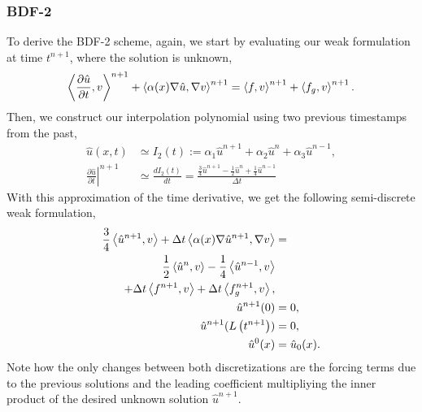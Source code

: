 \documentclass[../main.tex]{subfiles}
\newcommand{\inner}[2]{\left<#1, #2\right>}
\begin{document}
\subsubsection{BDF-2}
To derive the BDF-2 scheme, again, we start by evaluating our weak formulation at time $t^{n+1}$, where the solution is unknown,
\begin{equation}
    \inner{\frac{\partial \hat{u}}{\partial t}}{v}^{n+1} + \inner{\alpha(x) \grad \hat{u}}{\grad v}^{n+1} = \inner{f}{v}^{n+1} + \inner{f_g}{v}^{n+1}.
\end{equation}
Then, we construct our interpolation polynomial using two previous timestamps from the past, 
\begin{align}
    \hat{u}(x,t) &\simeq I_2(t) := 
      \alpha_1 \hat{u}^{n+1} 
    + \alpha_2 \hat{u}^{n}
    + \alpha_3 \hat{u}^{n-1}, \\
    \left.\frac{\partial\hat{u}}{\partial t}\right|^{n+1} &\simeq \frac{d I_2(t)}{dt} = 
    \frac{\frac{3}{4}\hat{u}^{n+1} - \frac{1}{2}\hat{u}^{n} + \frac{1}{4}\hat{u}^{n-1}}{\Delta t}
\end{align}
With this approximation of the time derivative, we get the following semi-discrete weak formulation, 
\begin{subequations}
    \begin{align}
        \label{eq:1d_fom_weak_formulation_semidiscrete_time_bdf2}
        \frac{3}{4}\inner{\hat{u}^{n+1}}{v} + \Delta t \inner{\alpha(x) \grad \hat{u}^{n+1}}{\grad v} &= \\
          \frac{1}{2}\inner{\hat{u}^{n}}{v}
        - \frac{1}{4}\inner{\hat{u}^{n-1}}{v} \\
        + \Delta t \inner{f^{n+1}}{v} + \Delta t \inner{f_g^{n+1}}{v}, \nonumber \\
        \hat{u}^{n+1}(0) &= 0, \\
        \hat{u}^{n+1}(L\left(t^{n+1}\right)) &= 0, \\
        \hat{u}^{0}(x) &= \hat{u}_0(x).
    \end{align}
\end{subequations}
Note how the only changes between both discretizations are the forcing terms due to the previous solutions and the leading coefficient multipliying the inner product of the desired unknown solution $\hat{u}^{n+1}$. 
\end{document}

